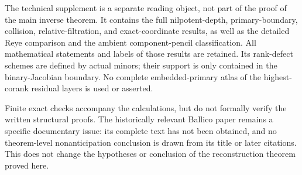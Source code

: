 The technical supplement is a separate reading object, not part of
the proof of the main inverse theorem.  It contains the full
nilpotent-depth, primary-boundary, collision, relative-filtration,
and exact-coordinate results, as well as the detailed Reye comparison
and the ambient component-pencil classification.  All mathematical
statements and labels of those results are retained.  Its rank-defect
schemes are defined by actual minors; their support is only contained
in the binary-Jacobian boundary.  No complete embedded-primary atlas
of the highest-corank residual layers is used or asserted.

Finite exact checks accompany the calculations, but do not formally
verify the written structural proofs.  The historically relevant
Ballico paper \cite{Ballico93} remains a specific documentary issue:
its complete text has not been obtained, and no theorem-level
nonanticipation conclusion is drawn from its title or later citations.
This does not change the hypotheses or conclusion of the reconstruction
theorem proved here.
